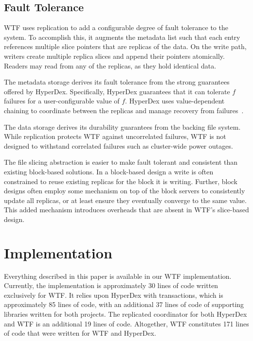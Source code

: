 \documentclass[twocolumn,10pt,letterpaper]{article}
\begin{document}
\subsection{Fault Tolerance}

WTF uses replication to add a configurable degree of fault tolerance to the
system.  To accomplish this, it augments the metadata list such that each entry
references multiple slice pointers that are replicas of the data.  On the write
path, writers create multiple replica slices and append their pointers
atomically.  Readers may read from any of the replicas, as they hold identical
data.

The metadata storage derives its fault tolerance from the strong guarantees
offered by HyperDex.  Specifically, HyperDex guarantees that it can tolerate $f$
failures for a user-configurable value of $f$.  HyperDex uses value-dependent
chaining to coordinate between the replicas and manage recovery from
failures~\cite{hyperdex}.

The data storage derives its durability guarantees from the backing file system.
While replication protects WTF against uncorrelated failures, WTF is not designed 
to withstand correlated failures such as cluster-wide power outages.

The file slicing abstraction is easier to make fault tolerant and consistent
than existing block-based solutions.  In a block-based design a write is often
constrained to reuse existing replicas for the block it is writing.  Further,
block designs often employ some mechanism on top of the block servers to
consistently update all replicas, or at least ensure they eventually converge to
the same value.  This added mechanism introduces overheads that are absent in
WTF's slice-based design.

\section{Implementation}

Everything described in this paper is available in our WTF implementation.
Currently, the implementation is approximately \unit{30}{\kilo} lines of code
written exclusively for WTF.  It relies upon HyperDex with transactions, which
is approximately \unit{85}{\kilo} lines of code, with an additional
\unit{37}{\kilo} lines of code of supporting libraries written for both
projects.  The replicated coordinator for both HyperDex and WTF is an additional
\unit{19}{\kilo} lines of code.  Altogether, WTF constitutes \unit{171}{\kilo}
lines of code that were written for WTF and HyperDex.
\end{document}

